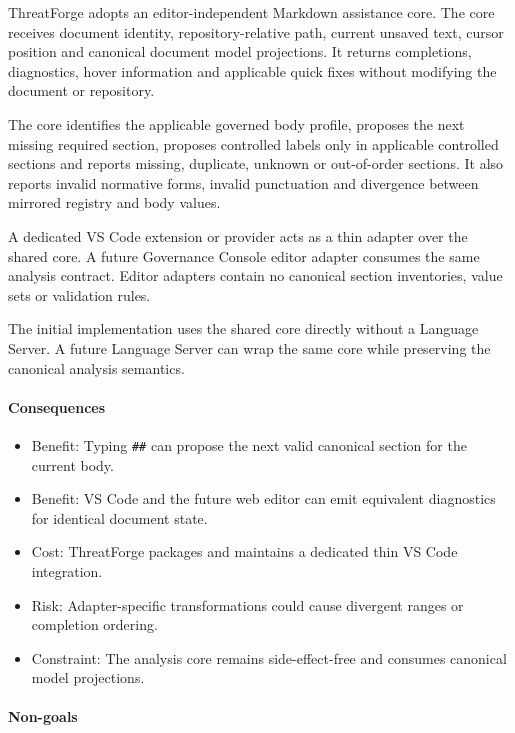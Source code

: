 \documentclass[
  10pt,
]{article}
\providecommand{\tightlist}{%
  \setlength{\itemsep}{0pt}\setlength{\parskip}{0pt}}
\begin{document}
ThreatForge adopts an editor-independent Markdown assistance core. The
core receives document identity, repository-relative path, current
unsaved text, cursor position and canonical document model projections.
It returns completions, diagnostics, hover information and applicable
quick fixes without modifying the document or repository.

The core identifies the applicable governed body profile, proposes the
next missing required section, proposes controlled labels only in
applicable controlled sections and reports missing, duplicate, unknown
or out-of-order sections. It also reports invalid normative forms,
invalid punctuation and divergence between mirrored registry and body
values.

A dedicated VS Code extension or provider acts as a thin adapter over
the shared core. A future Governance Console editor adapter consumes the
same analysis contract. Editor adapters contain no canonical section
inventories, value sets or validation rules.

The initial implementation uses the shared core directly without a
Language Server. A future Language Server can wrap the same core while
preserving the canonical analysis semantics.

\paragraph{Consequences}\label{consequences-28}

\begin{itemize}
\tightlist
\item
  Benefit: Typing \texttt{\#\#} can propose the next valid canonical
  section for the current body.
\item
  Benefit: VS Code and the future web editor can emit equivalent
  diagnostics for identical document state.
\item
  Cost: ThreatForge packages and maintains a dedicated thin VS Code
  integration.
\item
  Risk: Adapter-specific transformations could cause divergent ranges or
  completion ordering.
\item
  Constraint: The analysis core remains side-effect-free and consumes
  canonical model projections.
\end{itemize}

\paragraph{Non-goals}\label{non-goals-9}
\end{document}
